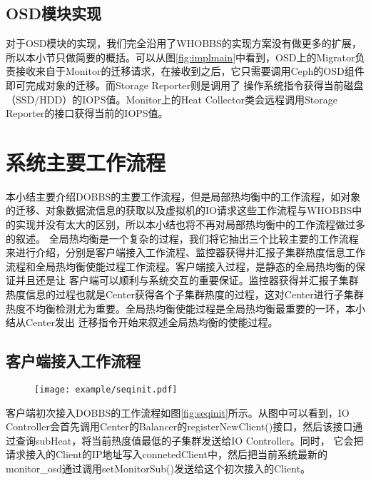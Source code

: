 \subsection{OSD模块实现}
对于OSD模块的实现，我们完全沿用了WHOBBS的实现方案没有做更多的扩展，所以本小节只做简要的概括。可以从图\ref{fig:implmain}中看到，OSD上的Migrator负责接收来自于Monitor的迁移请求，在接收到之后，它只需要调用Ceph的OSD组件即可完成对象的迁移。而Storage Reporter则是调用了
操作系统指令获得当前磁盘（SSD/HDD）的IOPS值。Monitor上的Heat Collector类会远程调用Storage Reporter的接口获得当前的IOPS值。

\section{系统主要工作流程}
本小结主要介绍DOBBS的主要工作流程，但是局部热均衡中的工作流程，如对象的迁移、对象数据流信息的获取以及虚拟机的IO请求这些工作流程与WHOBBS中的实现并没有太大的区别，所以本小结也将不再对局部热均衡中的工作流程做过多的叙述。
全局热均衡是一个复杂的过程，我们将它抽出三个比较主要的工作流程来进行介绍，分别是客户端接入工作流程、监控器获得并汇报子集群热度信息工作流程和全局热均衡使能过程工作流程。客户端接入过程，是静态的全局热均衡的保证并且还是让
客户端可以顺利与系统交互的重要保证。监控器获得并汇报子集群热度信息的过程也就是Center获得各个子集群热度的过程，这对Center进行子集群热度不均衡检测尤为重要。全局热均衡使能过程是全局热均衡最重要的一环，本小结从Center发出
迁移指令开始来叙述全局热均衡的使能过程。

\subsection{客户端接入工作流程}
\begin{figure}[!htp]
    \centering
    \texttt{[image: example/seqinit.pdf]}
\end{figure}

客户端初次接入DOBBS的工作流程如图\ref{fig:seqinit}所示。从图中可以看到，IO Controller会首先调用Center的Balancer的registerNewClient()接口，然后该接口通过查询subHeat，将当前热度值最低的子集群发送给IO Controller。同时，
它会把请求接入的Client的IP地址写入connetedClient中，然后把当前系统最新的monitor\_osd通过调用setMonitorSub()发送给这个初次接入的Client。

